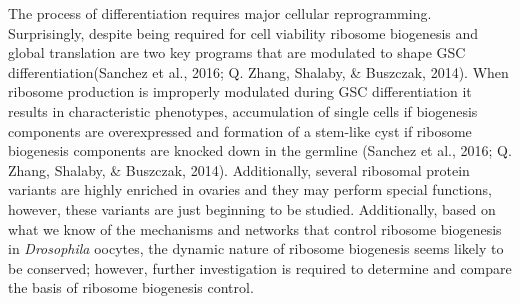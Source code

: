 \documentclass[12pt,oneside]{reedthesis}
\begin{document}
The process of differentiation requires major cellular reprogramming.
Surprisingly, despite being required for cell viability ribosome
biogenesis and global translation are two key programs that are
modulated to shape GSC differentiation(Sanchez et al., 2016; Q. Zhang, Shalaby, \& Buszczak, 2014).
When ribosome production is improperly modulated during GSC
differentiation it results in characteristic phenotypes, accumulation of
single cells if biogenesis components are overexpressed and formation of
a stem-like cyst if ribosome biogenesis components are knocked down in
the germline (Sanchez et al., 2016; Q. Zhang, Shalaby, \& Buszczak, 2014). Additionally, several
ribosomal protein variants are highly enriched in ovaries and they may
perform special functions, however, these variants are just beginning to
be studied. Additionally, based on what we know of the mechanisms and
networks that control ribosome biogenesis in \emph{Drosophila} oocytes, the
dynamic nature of ribosome biogenesis seems likely to be conserved;
however, further investigation is required to determine and compare the
basis of ribosome biogenesis control.
\end{document}
